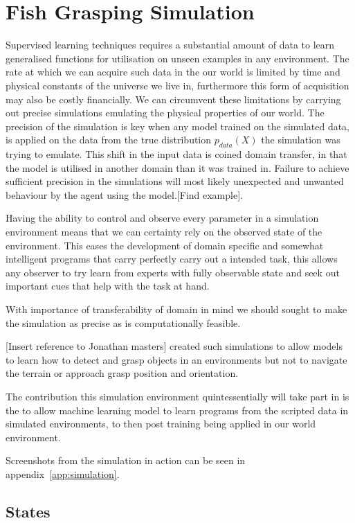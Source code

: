 \section{Fish Grasping Simulation}\label{sec:simulation}

Supervised learning techniques requires a substantial amount of data to learn generalised functions for utilisation on unseen examples in any environment. The rate at which we can acquire such data in the our world is limited by time and physical constants of the universe we live in, furthermore this form of acquisition may also be costly financially. We can circumvent these limitations by carrying out precise simulations emulating the physical properties of our world. The precision of the simulation is key when any model trained on the simulated data, is applied on the data from the true distribution $p_{data}(X)$ the simulation was trying to emulate. This shift in the input data is coined domain transfer, in that the model is utilised in another domain than it was trained in. Failure to achieve sufficient precision in the simulations will most likely unexpected and unwanted behaviour by the agent using the model.[Find example]. 

Having the ability to control and observe every parameter in a simulation environment means that we can certainty rely on the observed state of the environment. This eases the development of domain specific and somewhat intelligent programs that carry perfectly carry out a intended task, this allows any observer to try learn from experts with fully observable state and seek out important cues that help with the task at hand.   

With importance of transferability of domain in mind we should sought to make the simulation as precise as is computationally feasible.

[Insert reference to Jonathan masters] created such simulations to allow models to learn how to detect and grasp objects in an environments but not to navigate the terrain or approach grasp position and orientation.  

The contribution this simulation environment quintessentially will take part in is the to allow machine learning model to learn programs from the scripted data in simulated environments, to then post training being applied in our world environment.

Screenshots from the simulation in action can be seen in appendix~\ref{app:simulation}.

\subsection{States}

